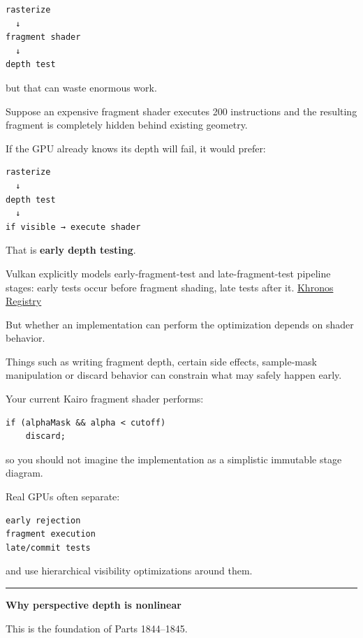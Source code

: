 \begin{verbatim}
rasterize
  ↓
fragment shader
  ↓
depth test
\end{verbatim}

but that can waste enormous work.

Suppose an expensive fragment shader executes 200 instructions and the resulting fragment is completely hidden behind existing geometry.

If the GPU already knows its depth will fail, it would prefer:

\begin{verbatim}
rasterize
  ↓
depth test
  ↓
if visible → execute shader
\end{verbatim}

That is \textbf{early depth testing}.

Vulkan explicitly models early-fragment-test and late-fragment-test pipeline stages: early tests occur before fragment shading, late tests after it. \href{https://registry.khronos.org/VulkanSC/specs/1.0-extensions/man/html/VkPipelineStageFlagBits2KHR.html?utm_source=chatgpt.com}{Khronos Registry}

But whether an implementation can perform the optimization depends on shader behavior.

Things such as writing fragment depth, certain side effects, sample-mask manipulation or discard behavior can constrain what may safely happen early.

Your current Kairo fragment shader performs:

\begin{verbatim}
if (alphaMask && alpha < cutoff)
    discard;
\end{verbatim}

so you should not imagine the implementation as a simplistic immutable stage diagram.

Real GPUs often separate:

\begin{verbatim}
early rejection
fragment execution
late/commit tests
\end{verbatim}

and use hierarchical visibility optimizations around them.

\begin{center}\rule{0.5\linewidth}{0.5pt}\end{center}

\textbf{Why perspective depth is nonlinear}

This is the foundation of Parts 1844--1845.

